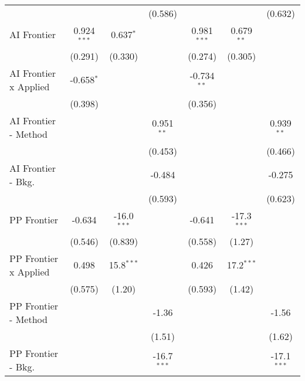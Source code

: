 \begin{tabular}{lcccccc}
                                &                &               & (0.586)       &                &               & (0.632)\\   
   AI Frontier                  & 0.924$^{***}$  & 0.637$^{*}$   &               & 0.981$^{***}$  & 0.679$^{**}$  &   \\   
                                & (0.291)        & (0.330)       &               & (0.274)        & (0.305)       &   \\   
   AI Frontier x Applied        & -0.658$^{*}$   &               &               & -0.734$^{**}$  &               &   \\   
                                & (0.398)        &               &               & (0.356)        &               &   \\   
   AI Frontier - Method         &                &               & 0.951$^{**}$  &                &               & 0.939$^{**}$\\   
                                &                &               & (0.453)       &                &               & (0.466)\\   
   AI Frontier - Bkg.           &                &               & -0.484        &                &               & -0.275\\   
                                &                &               & (0.593)       &                &               & (0.623)\\   
   PP Frontier                  & -0.634         & -16.0$^{***}$ &               & -0.641         & -17.3$^{***}$ &   \\   
                                & (0.546)        & (0.839)       &               & (0.558)        & (1.27)        &   \\   
   PP Frontier x Applied        & 0.498          & 15.8$^{***}$  &               & 0.426          & 17.2$^{***}$  &   \\   
                                & (0.575)        & (1.20)        &               & (0.593)        & (1.42)        &   \\   
   PP Frontier - Method         &                &               & -1.36         &                &               & -1.56\\   
                                &                &               & (1.51)        &                &               & (1.62)\\   
   PP Frontier - Bkg.           &                &               & -16.7$^{***}$ &                &               & -17.1$^{***}$\\   

\end{tabular}
